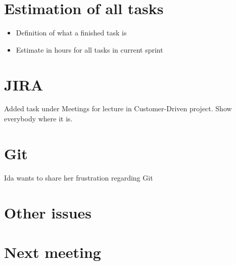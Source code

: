\documentclass[a4paper,12pt]{article}
\begin{document}
\section{Estimation of all tasks}
\begin{itemize}
\item
Definition of what a finished task is
\item
Estimate in hours for all tasks in current sprint
\end{itemize}
\section{JIRA}
Added task under Meetings for lecture in Customer-Driven project. Show everybody where it is.
\section{Git}
Ida wants to share her frustration regarding Git
\section{Other issues}
\section{Next meeting}
\end{document}
